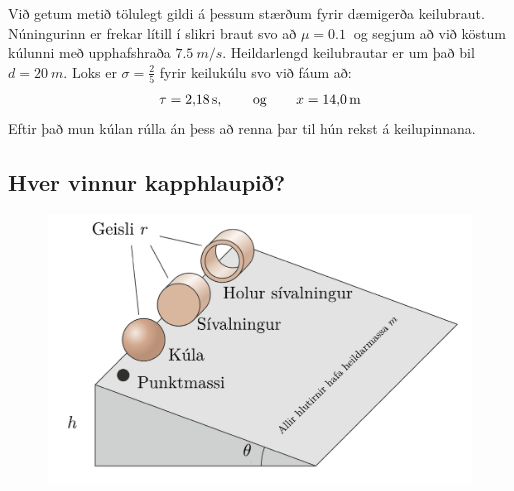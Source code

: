 \ifdefined \wholebook \else\documentclass[oneside]{book}\usepackage{EdlBook}\graphicspath{{figures/}}
\begin{document}
Við getum metið tölulegt gildi á þessum stærðum fyrir dæmigerða keilubraut. Núningurinn er frekar lítill í slikri braut svo að $\mu = \SI{0.1}{}$ og segjum að við köstum kúlunni með upphafshraða $\SI{7.5}{m/s}$. Heildarlengd keilubrautar er um það bil $d = \SI{20}{m}$. Loks er $\sigma = \frac{2}{5}$ fyrir keilukúlu svo við fáum að:
\begin{align*}
    \tau = \SI{2.18}{s}, \hspace{0.75cm} \text{og} \hspace{0.75cm} x = \SI{14.0}{m}
\end{align*}
Eftir það mun kúlan rúlla án þess að renna þar til hún rekst á keilupinnana. 


\subsection*{Hver vinnur kapphlaupið?}

\begin{figure}[H]
    \centering
    \includegraphics[scale=0.5]{figures/rullakeppni.pdf}
\end{figure}
\end{document}

